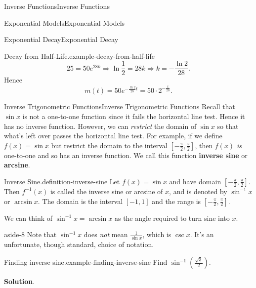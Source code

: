 \documentclass[10pt,]{book}
\newcommand{\terminology}[1]{\textbf{#1}}
\numberwithin{equation}{section}
\begin{document}
\begin{chapterptx}{Inverse Functions}{}{Inverse Functions}{}{}
\begin{sectionptx}{Exponential Models}{}{Exponential Models}{}{}
\begin{subsectionptx}{Exponential Decay}{}{Exponential Decay}{}{}
\begin{example}{Decay from Half-Life.}{example-decay-from-half-life}
\begin{equation*}
25 = 50e^{28k}\Rightarrow \ln\frac{1}{2} = 28k\Rightarrow k = -\frac{\ln2}{28}.
\end{equation*}
Hence%
\begin{equation*}
m(t) = 50e^{-\frac{\ln2}{28}t} = 50\cdot2^{-\frac{t}{28}}.
\end{equation*}
%
\end{example}
\end{subsectionptx}
\end{sectionptx}
%
%
\typeout{************************************************}
\typeout{************************************************}
%
\begin{sectionptx}{Inverse Trigonometric Functions}{}{Inverse Trigonometric Functions}{}{}\label{section-inverse-trigonometric-functions}
\hypertarget{p-257}{}%
Recall that \(\sin x\) is not a one-to-one function since it fails the horizontal line test. Hence it has no inverse function. However, we can \emph{restrict} the domain of \(\sin x\) so that what's left over passes the horizontal line test. For example, if we define \(f(x) = \sin x\) but restrict the domain to the interval \([-\frac{\pi}{2},\frac{\pi}{2}]\), then \(f(x)\) \emph{is} one-to-one and so has an inverse function. We call this function \terminology{inverse sine} or \terminology{arcsine}.%
\begin{definition}{Inverse Sine.}{definition-inverse-sine}%
\hypertarget{p-258}{}%
Let \(f(x) = \sin x\) and have domain \([-\frac{\pi}{2},\frac{\pi}{2}]\). Then \(f^{-1}(x)\) is called the inverse sine or arcsine of \(x\), and is denoted by \(\sin^{-1}x\) or \(\arcsin x\). The domain is the interval \([-1,1]\) and the range is \([-\frac{\pi}{2},\frac{\pi}{2}]\).%
\end{definition}
\hypertarget{p-259}{}%
We can think of \(\sin^{-1}x = \arcsin x\) as the angle required to turn sine into \(x\). \begin{aside}{}{aside-8}%
\hypertarget{p-260}{}%
Note that \(\sin^{-1}x\) does \emph{not} mean \(\frac{1}{\sin x}\), which is \(\csc x\). It's an unfortunate, though standard, choice of notation.%
\end{aside}
%
\begin{example}{Finding inverse sine.}{example-finding-inverse-sine}%
\hypertarget{p-261}{}%
Find \(\sin^{-1}(\frac{\sqrt{3}}{2})\).%
\par\smallskip%
\noindent\textbf{Solution}.\hypertarget{solution-56}{}\quad%
\hypertarget{p-262}{}%

\end{example}
\end{sectionptx}
\end{chapterptx}
\end{document}
